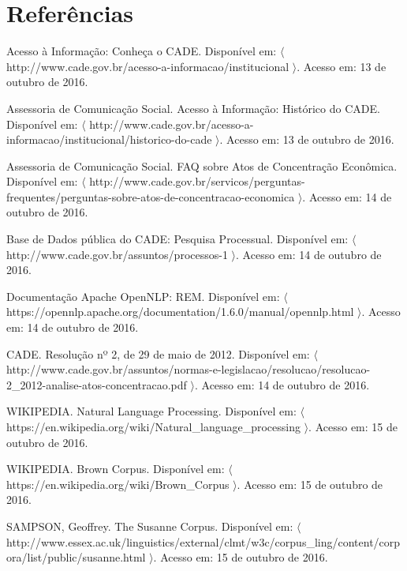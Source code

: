 \documentclass[11pt]{report}
\begin{document}
\pagebreak
\chapter*{Referências}

\begin{enumerate}[label={[\arabic*]}]
\item Acesso à Informação: Conheça o CADE. Disponível em: $\langle$ http://www.cade.gov.br/acesso-a-informacao/institucional $\rangle$. Acesso em: 13 de outubro de 2016.
\item Assessoria de Comunicação Social. Acesso à Informação: Histórico do CADE. Disponível em: $\langle$ http://www.cade.gov.br/acesso-a-informacao/institucional/historico-do-cade $\rangle$. Acesso em: 13 de outubro de 2016.
\item Assessoria de Comunicação Social. FAQ sobre Atos de Concentração Econômica. Disponível em: $\langle$ http://www.cade.gov.br/servicos/perguntas-frequentes/perguntas-sobre-atos-de-concentracao-economica $\rangle$. Acesso em: 14 de outubro de 2016.
\item Base de Dados pública do CADE: Pesquisa Processual. Disponível em: \newline$\langle$ http://www.cade.gov.br/assuntos/processos-1 $\rangle$. Acesso em: 14 de outubro de 2016.
\item Documentação Apache OpenNLP: REM. Disponível em: \newline$\langle$ https://opennlp.apache.org/documentation/1.6.0/manual/opennlp.html $\rangle$. \newline Acesso em: 14 de outubro de 2016.
\item CADE. Resolução nº 2, de 29 de maio de 2012. Disponível em: \newline$\langle$ http://www.cade.gov.br/assuntos/normas-e-legislacao/resolucao/resolucao-2\_2012-analise-atos-concentracao.pdf $\rangle$. Acesso em: 14 de outubro de 2016.
\item WIKIPEDIA. Natural Language Processing. Disponível em: \newline$\langle$ https://en.wikipedia.org/wiki/Natural\_language\_processing $\rangle$. Acesso em: 15 de outubro de 2016.
\item WIKIPEDIA. Brown Corpus. Disponível em: $\langle$ https://en.wikipedia.org/wiki/Brown\_Corpus $\rangle$. Acesso em: 15 de outubro de 2016.
\item SAMPSON, Geoffrey. The Susanne Corpus. Disponível em: \newline$\langle$ http://www.essex.ac.uk/linguistics/external/clmt/w3c/corpus\_ling/content/\newline corpora/list/public/susanne.html $\rangle$. Acesso em: 15 de outubro de 2016.

\end{enumerate}
\end{document}
